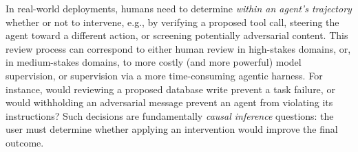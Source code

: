 In real-world deployments, humans need to determine {\em within an agent's trajectory} whether or not to intervene, e.g., by verifying a proposed tool call, steering the agent toward a different action, or screening potentially adversarial content. This review process can correspond to either human review in high-stakes domains, or, in medium-stakes domains, to more costly (and more powerful) model supervision, or supervision via a more time-consuming agentic harness.
For instance, would reviewing a proposed database write prevent a task failure, or would withholding an adversarial message prevent an agent from violating its instructions?
Such decisions are fundamentally {\em causal inference} questions: the user must determine whether applying an intervention would improve the final outcome.




